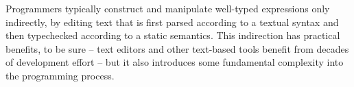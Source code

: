 





Programmers typically construct and manipulate well-typed expressions only indirectly, by editing text that is first parsed according to a textual syntax and then typechecked according to a static semantics. This indirection has practical benefits, to be sure -- text editors and other text-based tools benefit from decades of development effort -- but it also introduces some fundamental complexity into the programming process. 


